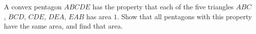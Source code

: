 A convex pentagon $ABCDE$ has the property that each of the five triangles $ABC$, $BCD$, $CDE$, $DEA$, $EAB$ has area $1$. Show that all pentagons with this property have the same area, and find that area.
